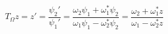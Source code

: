 \begin{equation}
T_{\Omega} z = z' = \frac{\psi_2'}{\psi_1'} = \frac{\omega_2 \psi_1 + \omega_1^* \psi_2}{\omega_1 \psi_1 -\omega_2^* \psi_2} = \frac{\omega_2 + \omega_1^* z}{ \omega_1 - \omega_2^* z}
\end{equation}

